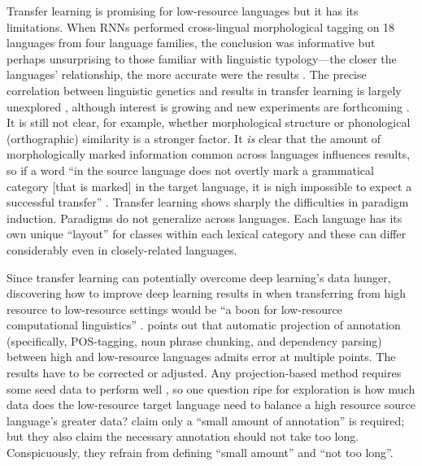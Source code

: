 \documentclass[12pt]{article}
\begin{document}
Transfer learning is promising for low-resource languages but it has its limitations. When RNNs performed cross-lingual morphological tagging on 18 languages from four language families, the conclusion was informative but perhaps unsurprising to those familiar with linguistic typology---the closer the languages' relationship, the more accurate were the results \cite{cotterell_cross-lingual_2017}. The precise correlation between linguistic genetics and results in transfer learning is largely unexplored \cite{buys_cross-lingual_2016,cotterell_cross-lingual_2017}, although interest is growing and new experiments are forthcoming \cite{sigmorphon2019}.  It is still not clear, for example, whether morphological structure or phonological (orthographic) similarity is a stronger factor. It \textit{is} clear that the amount of morphologically marked information common across languages influences results, so if a word ``in the source language does not overtly mark a grammatical category [that is marked] in the target language, it is nigh impossible to expect a successful transfer'' \cite[p.749]{cotterell_cross-lingual_2017}. Transfer learning shows sharply the difficulties in paradigm induction.  Paradigms do not generalize across languages. Each language has its own unique ``layout'' for classes within each lexical category and these can differ considerably even in closely-related languages.

Since transfer learning can potentially overcome deep learning’s data hunger, discovering how to improve deep learning results in when transferring from high resource  to low-resource settings would be ``a boon for low-resource computational linguistics'' \cite[p. 752]{cotterell_cross-lingual_2017}.  points out that automatic projection of annotation (specifically, POS-tagging, noun phrase chunking, and dependency parsing) between high and low-resource languages admits error at multiple points. The results have to be corrected or adjusted. Any projection-based method requires some seed data to perform well \cite{buys_cross-lingual_2016}, so one question ripe for exploration is how much data does the low-resource target language need to balance a high resource source language's greater data?  claim only a “small amount of annotation” is required; but they also claim the necessary annotation should not take too long. Conspicuously, they refrain from defining “small amount” and “not too long”. 
\end{document}
